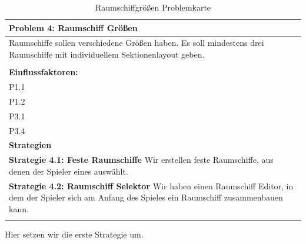 \documentclass[fontsize=12pt,paper=a4,twoside]{scrartcl}
\begin{document}
\begin{table}[H]
    \centering
    \begin{tabular}{|p{15cm}|}
    \hline
          \textbf{Problem 4: Raumschiff Größen}  \\ \hline
	Raumschiffe sollen verschiedene Größen haben. Es soll mindestens drei Raumschiffe mit individuellem Sektionenlayout geben. \\
         \\ \hline
          \textbf{Einflussfaktoren: } \\
	P1.1 \\
	P1.2 \\
	P3.1 \\
	P3.4 \\
          \hline
          \textbf{Strategien} \\ \hline
            {}          
           \label{strategie:4.1}     
          \textbf{Strategie 4.1: Feste Raumschiffe} Wir erstellen feste Raumschiffe, aus denen der Spieler eines auswählt. \\        
  {}          
           \label{strategie:4.2}              
          \textbf{Strategie 4.2: Raumschiff Selektor} Wir haben einen Raumschiff Editor, in dem der Spieler sich am Anfang des Spieles ein Raumschiff zusammenbauen kann. \\
	 \\ \hline
    \end{tabular}

    \caption{Raumschiffgrößen Problemkarte}
    \label{tab:ProblemKarte4}
\end{table}
Hier setzen wir die erste Strategie um. \\
\end{document}
